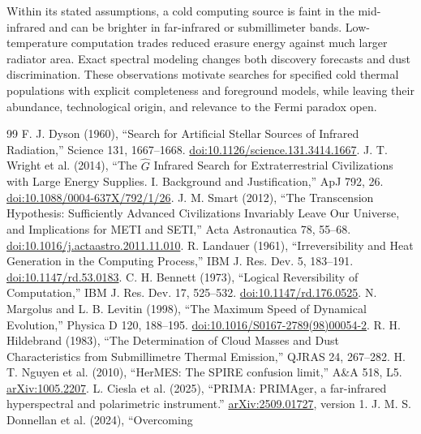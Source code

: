 \documentclass[10pt,twocolumn]{article}
\begin{document}
Within its stated assumptions, a cold computing source is faint in the
mid-infrared and can be brighter in far-infrared or submillimeter bands.
Low-temperature computation trades reduced erasure energy against much
larger radiator area. Exact spectral modeling changes both discovery
forecasts and dust discrimination. These observations motivate searches
for specified cold thermal populations with explicit completeness and
foreground models, while leaving their abundance, technological origin,
and relevance to the Fermi paradox open.

\begin{thebibliography}{99}
 F. J. Dyson (1960), ``Search for Artificial Stellar
Sources of Infrared Radiation,'' Science 131, 1667--1668.
\href{https://doi.org/10.1126/science.131.3414.1667}{doi:10.1126/science.131.3414.1667}.
 J. T. Wright et al. (2014), ``The $\hat G$ Infrared
Search for Extraterrestrial Civilizations with Large Energy Supplies.
I. Background and Justification,'' ApJ 792, 26.
\href{https://doi.org/10.1088/0004-637X/792/1/26}{doi:10.1088/0004-637X/792/1/26}.
 J. M. Smart (2012), ``The Transcension Hypothesis:
Sufficiently Advanced Civilizations Invariably Leave Our Universe, and
Implications for METI and SETI,'' Acta Astronautica 78, 55--68.
\href{https://doi.org/10.1016/j.actaastro.2011.11.010}{doi:10.1016/j.actaastro.2011.11.010}.
 R. Landauer (1961), ``Irreversibility and Heat
Generation in the Computing Process,'' IBM J. Res. Dev. 5, 183--191.
\href{https://doi.org/10.1147/rd.53.0183}{doi:10.1147/rd.53.0183}.
 C. H. Bennett (1973), ``Logical Reversibility of
Computation,'' IBM J. Res. Dev. 17, 525--532.
\href{https://doi.org/10.1147/rd.176.0525}{doi:10.1147/rd.176.0525}.
 N. Margolus and L. B. Levitin (1998), ``The Maximum
Speed of Dynamical Evolution,'' Physica D 120, 188--195.
\href{https://doi.org/10.1016/S0167-2789(98)00054-2}{doi:10.1016/S0167-2789(98)00054-2}.
 R. H. Hildebrand (1983), ``The Determination of
Cloud Masses and Dust Characteristics from Submillimetre Thermal
Emission,'' QJRAS 24, 267--282.
 H. T. Nguyen et al. (2010), ``HerMES: The SPIRE
confusion limit,'' A\&A 518, L5.
\href{https://arxiv.org/abs/1005.2207}{arXiv:1005.2207}.
 L. Ciesla et al. (2025), ``PRIMA: PRIMAger, a
far-infrared hyperspectral and polarimetric instrument.''
\href{https://arxiv.org/abs/2509.01727}{arXiv:2509.01727}, version 1.
 J. M. S. Donnellan et al. (2024), ``Overcoming

\end{thebibliography}
\end{document}
